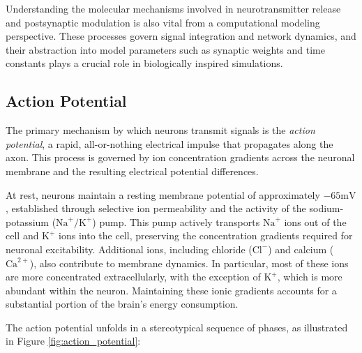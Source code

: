 Understanding the molecular mechanisms involved in neurotransmitter release and postsynaptic modulation is also vital from a computational modeling perspective. These processes govern signal integration and network dynamics, and their abstraction into model parameters such as synaptic weights and time constants plays a crucial role in biologically inspired simulations.

\subsection{Action Potential}
\label{subsec:action_potential}

The primary mechanism by which neurons transmit signals is the \emph{action potential}, a rapid, all-or-nothing electrical impulse that propagates along the axon. This process is governed by ion concentration gradients across the neuronal membrane and the resulting electrical potential differences.

At rest, neurons maintain a resting membrane potential of approximately $-65 \text{mV}$, established through selective ion permeability and the activity of the sodium-potassium ($\text{Na}^{+}/\text{K}^{+}$) pump. This pump actively transports $\text{Na}^{+}$ ions out of the cell and $\text{K}^{+}$ ions into the cell, preserving the concentration gradients required for neuronal excitability. Additional ions, including chloride ($\text{Cl}^{-}$) and calcium ($\text{Ca}^{2+}$), also contribute to membrane dynamics. In particular, most of these ions are more concentrated extracellularly, with the exception of $\text{K}^{+}$, which is more abundant within the neuron. Maintaining these ionic gradients accounts for a substantial portion of the brain's energy consumption.

The action potential unfolds in a stereotypical sequence of phases, as illustrated in Figure \ref{fig:action_potential}:


